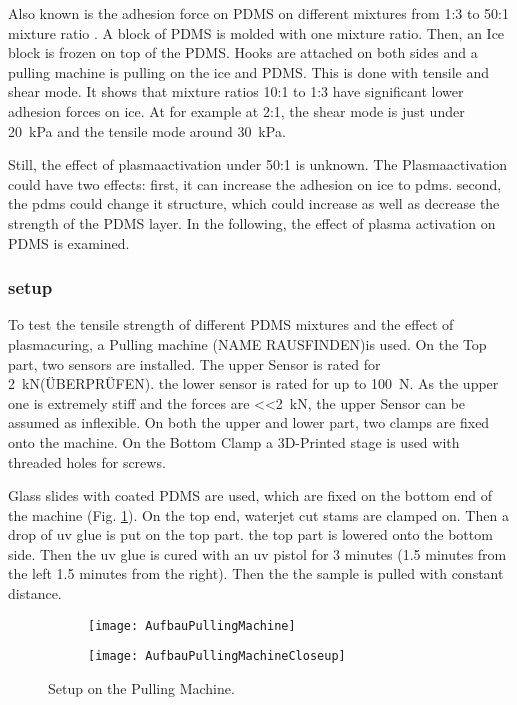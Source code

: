 Also known is the adhesion force on PDMS on different mixtures from 1:3 to 50:1 mixture ratio \cite{IbanezIbanez.2022}. A block of PDMS is molded with one mixture ratio. Then, an Ice block is frozen on top of the PDMS. Hooks are attached on both sides and a pulling machine is pulling on the ice and PDMS. This is done with tensile and shear mode. It shows that mixture ratios 10:1 to 1:3 have significant lower adhesion forces on ice. At for example at 2:1, the shear mode is just under \SI{20}{\kilo\pascal} and the tensile mode around \SI{30}{\kilo\pascal}. 

Still, the effect of plasmaactivation under 50:1 is unknown. The Plasmaactivation could have two effects: first, it can increase the adhesion on ice to pdms. second, the pdms could change it structure, which could increase as well as decrease the strength of the PDMS layer. In the following, the effect of plasma activation on PDMS is examined.

\subsubsection{setup}

To test the tensile strength of different PDMS mixtures and the effect of plasmacuring, a Pulling machine (NAME RAUSFINDEN)is used. 
On the Top part, two sensors are installed. The upper Sensor is rated for \SI{2}{\kilo\newton}(ÜBERPRÜFEN). the lower sensor is rated for up to \SI{100}{\newton}. As the upper one is extremely stiff and the forces are \SI{<<2}{\kilo\newton}, the upper Sensor can be assumed as inflexible. On both the upper and lower part, two clamps are fixed onto the machine. On the Bottom Clamp a 3D-Printed stage is used with threaded holes for screws. 

Glass slides with coated PDMS are used, which are fixed on the bottom end of the machine (Fig. \ref{fig:PullingMachineSetup}). On the top end, waterjet cut stams are clamped on. Then a drop of uv glue is put on the top part. the top part is lowered onto the bottom side. Then the uv glue is cured with an uv pistol for 3 minutes (1.5 minutes from the left 1.5 minutes from the right). Then the the sample is pulled with constant distance.

\begin{figure}[hbt!]
	\centering
	\begin{subfigure}[]{0.45\textwidth}
		\centering
		\texttt{[image: AufbauPullingMachine]}
		\caption{}
	\end{subfigure}
	\begin{subfigure}[]{0.45\textwidth}
		\centering
		\texttt{[image: AufbauPullingMachineCloseup]}
		\caption{}
	\end{subfigure}
	\caption{Setup on the Pulling Machine.}
	\label{fig:PullingMachineSetup}
\end{figure}

